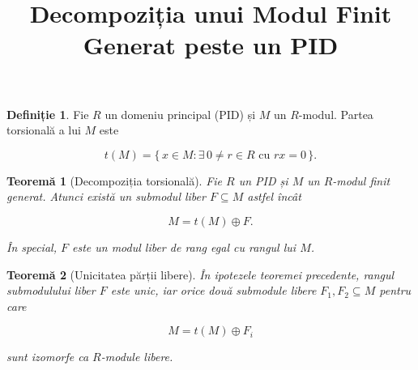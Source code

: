 \documentclass[12pt]{article}
\title{Decompoziția unui Modul Finit Generat peste un PID}
\author{}
\date{}
\theoremstyle{definition}
\newtheorem{definition}{Definiție}
\theoremstyle{plain}
\newtheorem{theorem}{Teoremă}
\begin{document}
\maketitle

\begin{definition}
Fie $R$ un domeniu principal (PID) și $M$ un $R$-modul. Partea torsională a lui $M$ este


\[
t(M) = \{\, x \in M : \exists\, 0 \ne r \in R \text{ cu } rx = 0 \,\}.
\]


\end{definition}

\begin{theorem}[Decompoziția torsională]
Fie $R$ un PID și $M$ un $R$-modul finit generat. Atunci există un submodul liber
$F \subseteq M$ astfel încât


\[
M = t(M) \oplus F.
\]


În special, $F$ este un modul liber de rang egal cu rangul lui $M$.
\end{theorem}

\begin{theorem}[Unicitatea părții libere]
În ipotezele teoremei precedente, rangul submodulului liber $F$ este unic, iar orice două
submodule libere $F_1, F_2 \subseteq M$ pentru care


\[
M = t(M) \oplus F_i
\]


sunt izomorfe ca $R$-module libere.
\end{theorem}
\end{document}
